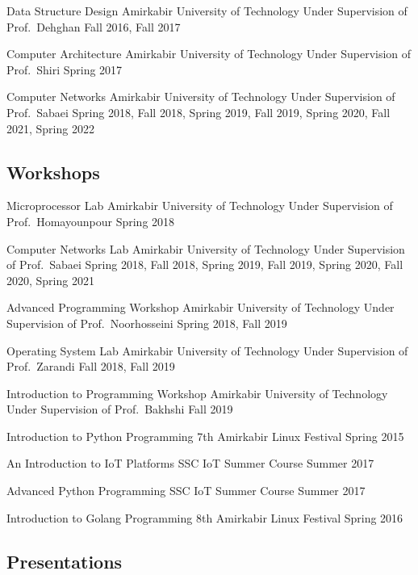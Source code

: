 \cventry{}
  {Data Structure Design}
  {}
  {Amirkabir University of Technology}
  {Under Supervision of Prof.\ Dehghan}
  {Fall 2016, Fall 2017}

\cventry{}
  {Computer Architecture}
  {}
  {Amirkabir University of Technology}
  {Under Supervision of Prof.\ Shiri}
  {Spring 2017}

\cventry{}
  {Computer Networks}
  {}
  {Amirkabir University of Technology}
  {Under Supervision of Prof.\ Sabaei}
  {Spring 2018, Fall 2018, Spring 2019, Fall 2019, Spring 2020, Fall 2021, Spring 2022}

\subsection{Workshops}

\cventry{}
  {Microprocessor Lab}
  {}
  {Amirkabir University of Technology}
  {Under Supervision of Prof.\ Homayounpour}
  {Spring 2018}

\cventry{}
  {Computer Networks Lab}
  {}
  {Amirkabir University of Technology}
  {Under Supervision of Prof.\ Sabaei}
  {Spring 2018, Fall 2018, Spring 2019, Fall 2019, Spring 2020, Fall 2020, Spring 2021}

\cventry{}
  {Advanced Programming Workshop}
  {}
  {Amirkabir University of Technology}
  {Under Supervision of Prof.\ Noorhosseini}
  {Spring 2018, Fall 2019}

\cventry{}
  {Operating System Lab}
  {}
  {Amirkabir University of Technology}
  {Under Supervision of Prof.\ Zarandi}
  {Fall 2018, Fall 2019}

\cventry{}
  {Introduction to Programming Workshop}
  {}
  {Amirkabir University of Technology}
  {Under Supervision of Prof.\ Bakhshi}
  {Fall 2019}

\cventry{}
  {Introduction to Python Programming}
  {}
  {7th Amirkabir Linux Festival}
  {}
  {Spring 2015}

\cventry{}
  {An Introduction to IoT Platforms}
  {}
  {SSC IoT Summer Course}
  {}
  {Summer 2017}

\cventry{}
  {Advanced Python Programming}
  {}
  {SSC IoT Summer Course}
  {}
  {Summer 2017}

\cventry{}
  {Introduction to Golang Programming}
  {}
  {8th Amirkabir Linux Festival}
  {}
  {Spring 2016}

\subsection{Presentations}

